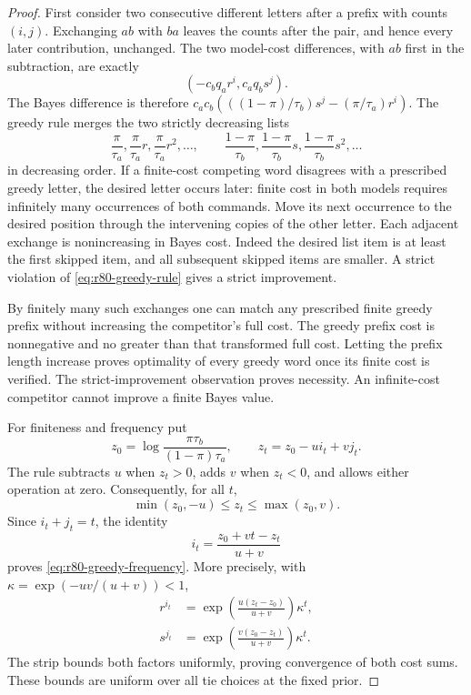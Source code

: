 \begin{proof}
First consider two consecutive different letters after a prefix
with counts $(i,j)$.  Exchanging $ab$ with $ba$ leaves the counts
after the pair, and hence every later contribution, unchanged.
The two model-cost differences, with $ab$ first in the subtraction,
are exactly
\begin{equation}\label{eq:r80-exchange-vector}
 (-c_bq_a r^i,c_aq_b s^j).
\end{equation}
The Bayes difference is therefore
$c_ac_b(((1-\pi)/\tau_b)s^j-(\pi/\tau_a)r^i)$.  The greedy rule merges the two
strictly decreasing lists
\[
 \frac\pi{\tau_a},\frac\pi{\tau_a}r,
       \frac\pi{\tau_a}r^2,\ldots,
 \qquad
 \frac{1-\pi}{\tau_b},\frac{1-\pi}{\tau_b}s,
       \frac{1-\pi}{\tau_b}s^2,\ldots
\]
in decreasing order.  If a finite-cost competing word disagrees
with a prescribed greedy letter, the desired letter occurs later:
finite cost in both models requires infinitely many occurrences
of both commands.  Move its next occurrence to the desired
position through the intervening copies of the other letter.
Each adjacent exchange is nonincreasing in Bayes cost.  Indeed
the desired list item is at least the first skipped item, and
all subsequent skipped items are smaller.  A strict violation
of \eqref{eq:r80-greedy-rule} gives a strict improvement.

By finitely many such exchanges one can match any prescribed
finite greedy prefix without increasing the competitor's full
cost.  The greedy prefix cost is nonnegative and no greater than
that transformed full cost.  Letting the prefix length increase
proves optimality of every greedy word once its finite cost is
verified.  The strict-improvement observation proves necessity.
An infinite-cost competitor cannot improve a finite Bayes value.

For finiteness and frequency put
\[
 z_0=\log\frac{\pi\tau_b}{(1-\pi)\tau_a},\qquad
 z_t=z_0-ui_t+vj_t.
\]
The rule subtracts $u$ when $z_t>0$, adds $v$ when $z_t<0$, and
allows either operation at zero.  Consequently, for all $t$,
\begin{equation}\label{eq:r80-log-strip}
 \min(z_0,-u)\le z_t\le\max(z_0,v).
\end{equation}
Since $i_t+j_t=t$, the identity
\[
 i_t=\frac{z_0+vt-z_t}{u+v}
\]
proves \eqref{eq:r80-greedy-frequency}.  More precisely, with
$\kappa=\exp(-uv/(u+v))<1$,
\begin{align*}
 r^{i_t}
 &=\exp\!\left(\frac{u(z_t-z_0)}{u+v}\right)\kappa^t,\\
 s^{j_t}
 &=\exp\!\left(\frac{v(z_0-z_t)}{u+v}\right)\kappa^t.
\end{align*}
The strip bounds both factors uniformly, proving convergence of
both cost sums.  These bounds are uniform over all tie choices
at the fixed prior.


\end{proof}
